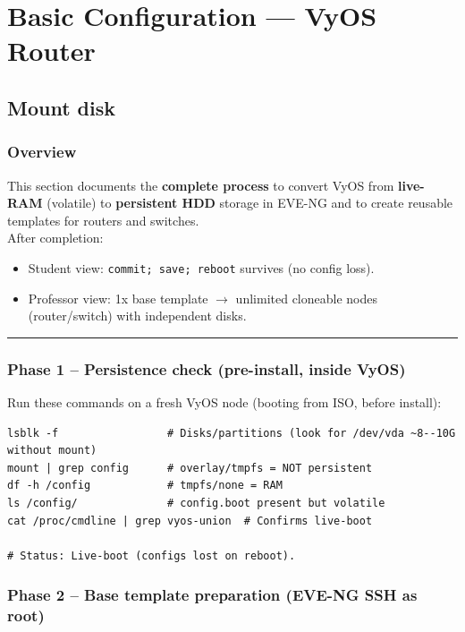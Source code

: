 \chapter{Basic Configuration --- VyOS Router}

\section{Mount disk}

\subsection{Overview}

This section documents the \textbf{complete process} to convert VyOS from \textbf{live-RAM} (volatile) to \textbf{persistent HDD} storage in EVE-NG and to create reusable templates for routers and switches.\\
After completion:

\begin{itemize}
\tightlist
\item
  Student view: \texttt{commit;\ save;\ reboot} survives (no config loss).
\item
  Professor view: 1x base template $\rightarrow$ unlimited cloneable nodes (router/switch) with independent disks.
\end{itemize}

\begin{center}\rule{0.5\linewidth}{0.5pt}\end{center}

\subsection{Phase 1 -- Persistence check (pre-install, inside VyOS)}

Run these commands on a fresh VyOS node (booting from ISO, before install):

\begin{lstlisting}
lsblk -f                 # Disks/partitions (look for /dev/vda ~8--10G without mount)
mount | grep config      # overlay/tmpfs = NOT persistent
df -h /config            # tmpfs/none = RAM
ls /config/              # config.boot present but volatile
cat /proc/cmdline | grep vyos-union  # Confirms live-boot

# Status: Live-boot (configs lost on reboot).
\end{lstlisting}

\subsection{Phase 2 -- Base template preparation (EVE-NG SSH as root)}

